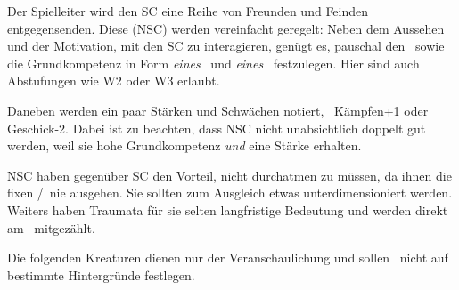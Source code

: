 {	\noindent
	Der Spielleiter wird den SC eine Reihe von Freunden und Feinden entgegensenden. Diese  (NSC) werden vereinfacht geregelt: Neben dem Aussehen und der Motivation, mit den SC zu interagieren, genügt es, pauschal den \HD\ sowie die Grundkompetenz in Form \emph{eines} \AD\ und \emph{eines} \RD\ festzulegen. Hier sind auch Abstufungen wie W2 oder W3 erlaubt.


	\noindent
	Daneben werden ein paar Stärken und Schwächen notiert, \zB\ Kämpfen+1 oder Geschick-2. Dabei ist zu beachten, dass NSC nicht unabsichtlich doppelt gut werden, weil sie hohe Grundkompetenz \emph{und} eine Stärke erhalten.

	NSC haben gegenüber SC den Vorteil, nicht durchatmen zu müssen, da ihnen die fixen \AD/\RD\ nie ausgehen. Sie sollten zum Ausgleich etwas unterdimensioniert werden. Weiters haben Traumata für sie selten langfristige Bedeutung und werden direkt am \HD\ mitgezählt.


	\noindent
	Die folgenden Kreaturen dienen nur der Veranschaulichung und sollen \nipajin\ nicht auf bestimmte Hintergründe festlegen.


}
